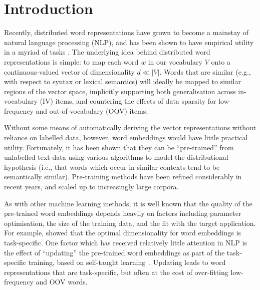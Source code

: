 \section{Introduction}

Recently, distributed word representations have grown to become a
mainstay of natural language processing (NLP), and has been shown to have
empirical utility in a myriad of tasks
\cite{Collobert2008,turian2010word,baroni:2014,Andreas:Klein:2014}.  The
underlying idea behind distributed word representations is simple: to
map each word $w$ in our vocabulary $V$ onto a continuous-valued vector
of dimensionality $d \ll |V|$.  Words that are similar
(e.g., with respect to syntax or lexical semantics) will ideally be mapped to
similar regions of the vector space, implicitly supporting both
generalisation across in-vocabulary (IV) items, and countering the
effects of data sparsity for low-frequency and out-of-vocabulary (OOV)
items.

Without some means of automatically deriving the vector representations
without reliance on labelled data, however, word embeddings would have
little practical utility. Fortunately, it has been shown that they can
be ``pre-trained'' from unlabelled text data using various algorithms 
to model the distributional hypothesis (i.e., that
words which occur in similar contexts tend to be semantically
similar). Pre-training methods have been refined considerably in recent
years, and scaled up to increasingly large corpora.

As with other machine learning methods, it is well known that the
quality of the pre-trained word embeddings depends heavily on factors
including parameter optimisation, the size of the training data, and the
fit with the target application. For example, 
showed that the optimal dimensionality for word embeddings is task-specific.  
One factor which has received relatively little attention in
NLP is the effect of ``updating'' the pre-trained word embeddings as
part of the task-specific training, based on self-taught
learning~\cite{raina2007self}.  Updating leads to word
representations that are task-specific, but often at the cost of
over-fitting low-frequency and OOV words.


